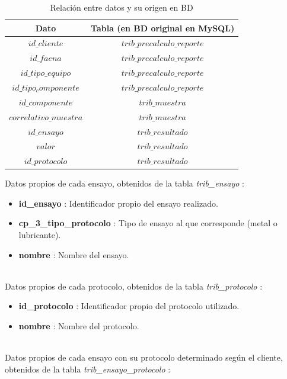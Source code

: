 \documentclass{article}
\begin{document}
\begin{table}[!htbp]\centering
\begin{tabular}{|c|c|}
\hline 
Dato & Tabla (en BD original en MySQL) \\ 
\hline 
$id\_cliente$ & $trib\_precalculo\_reporte$ \\ 
\hline 
$id\_faena$ & $trib\_precalculo\_reporte$ \\ 
\hline 
$id\_tipo\_equipo$ & $trib\_precalculo\_reporte$ \\ 
\hline 
$id\_tipo_componente$ & $trib\_precalculo\_reporte$ \\ 
\hline 
$id\_componente$ & $trib\_muestra$ \\ 
\hline 
$correlativo\_muestra$ & $trib\_muestra$ \\ 
\hline 
$id\_ensayo$ & $trib\_resultado$ \\ 
\hline 
$valor$ & $trib\_resultado$ \\ 
\hline 
$id\_protocolo$ & $trib\_resultado$ \\ 
\hline 
\end{tabular} 
\caption{Relación entre datos y su origen en BD}
\end{table}

Datos propios de cada ensayo, obtenidos de la tabla \textit{trib\_ensayo} :

\begin{itemize}
	\item \textbf{id\_ensayo} : Identificador propio del ensayo realizado.
	\item \textbf{cp\_3\_tipo\_protocolo} : Tipo de ensayo al que corresponde (metal o lubricante).
	\item \textbf{nombre} : Nombre del ensayo.
\end{itemize}
~\\
Datos propios de cada protocolo, obtenidos de la tabla \textit{trib\_protocolo} :

\begin{itemize}
	\item \textbf{id\_protocolo} : Identificador propio del protocolo utilizado.
	\item \textbf{nombre} : Nombre del protocolo.
\end{itemize}
~\\
Datos propios de cada ensayo con su protocolo determinado según el cliente, obtenidos de la tabla \textit{trib\_ensayo\_protocolo} :
\end{document}
